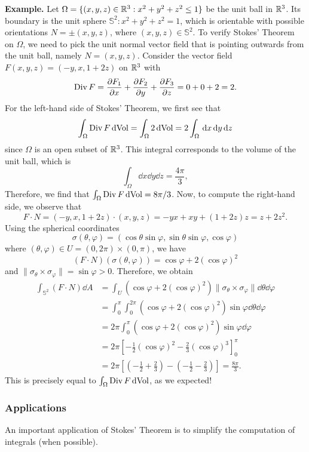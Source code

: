 {\bf Example.} Let $\Omega = \{(x, y, z) \in \mathbb{R}^3 : x^2 + y^2 + z^2 \leq 1\}$ be the 
unit ball in $\mathbb{R}^3$. Its boundary is the unit sphere $\mathbb S^2 : x^2 + y^2 + z^2 = 1$, 
which is orientable with possible orientations $N = \pm(x, y, z)$, where 
$(x, y, z) \in \mathbb S^2$. To verify Stokes' Theorem on $\Omega$, we need 
to pick the unit normal vector field that is pointing outwards from the 
unit ball, namely $N = (x, y, z)$. Consider the vector field 
$F(x, y, z) = (-y, x, 1 + 2z)$ on $\mathbb{R}^3$ with 
\[ \operatorname{Div} F = \frac{\partial F_1}{\partial x} + \frac{\partial F_2}{\partial y} 
+ \frac{\partial F_3}{\partial z} = 0 + 0 + 2 = 2. \] 
For the left-hand side of Stokes' Theorem, we first see that
\[ \int_\Omega \operatorname{Div} F \operatorname{dVol} = \int_\Omega 2\operatorname{dVol} = 2 \int_\Omega \,\mathrm{d} x \,\mathrm{d} y \,\mathrm{d} z \] 
since $\Omega$ is an open subset of $\mathbb{R}^3$. This integral corresponds to the volume of the unit ball, which is 
\[ \int_\Omega \dd x \dd y \dd z = \frac{4\pi}3, \] 
Therefore, we find that $\int_\Omega \operatorname{Div} F \operatorname{dVol} = 8\pi/3$. Now, 
to compute the right-hand side, we observe that 
\[ F \cdot N = (-y, x, 1+2z) \cdot (x, y, z) = -yx + xy + (1+2z)z = z + 2z^2. \] 
Using the spherical coordinates 
\[ \sigma(\theta, \varphi) = (\cos\theta\sin\varphi, \sin\theta\sin\varphi, \cos\varphi) \] 
where $(\theta, \varphi) \in U = (0, 2\pi) \times (0, \pi)$, we have 
\[ (F \cdot N)(\sigma(\theta, \varphi)) = \cos \varphi + 2(\cos \varphi)^2 \] 
and $\|\sigma_\theta \times \sigma_\varphi\| = \sin \varphi > 0$. 
Therefore, we obtain 
\begin{align*}
    \int_{\mathbb S^2} (F \cdot N)\dd A 
    &= \int_U (\cos\varphi + 2(\cos\varphi)^2)\|\sigma_\theta \times \sigma_\varphi\|\dd\theta\dd\varphi \\ 
    &= \int_0^\pi \int_0^{2\pi} (\cos\varphi + 2(\cos\varphi)^2) \sin\varphi \dd\theta \dd \varphi \\ 
    &= 2\pi \int_0^\pi (\cos\varphi + 2(\cos\varphi)^2) \sin\varphi\dd\varphi \\ 
    &= 2\pi \left[ -\frac12(\cos\varphi)^2 - \frac23(\cos\varphi)^3 \right]_0^\pi \\ 
    &= 2\pi \left[ \left( -\frac12 + \frac23 \right) - \left( -\frac12 - \frac23 \right) \right]  
    = \frac{8\pi}{3}.
\end{align*}
This is precisely equal to $\int_\Omega \operatorname{Div} F \operatorname{dVol}$, as we expected! 

\subsubsection{Applications} \label{subsubsec:4.3.1}
An important application of Stokes' Theorem is to simplify the computation 
of integrals (when possible). 

